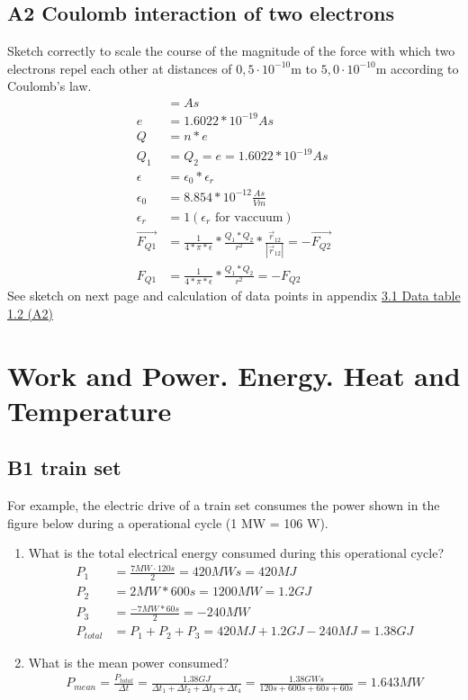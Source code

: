 \documentclass[10pt,ngerman]{scrartcl}
\begin{document}
\subsection{A2 Coulomb interaction of two electrons}
Sketch correctly to scale the course of the magnitude of the force with which two electrons repel each other at distances of $0,5 \cdot 10^{-10}$m to $5,0 \cdot 10^{-10}$m according to Coulomb's law.
\begin{align*}
	[Q] &= As \\
	e &= 1.6022 * 10^{-19} As \\
	Q &= n * e \\
	Q_{1} &= Q_{2} = e = 1.6022 * 10^{-19} As \\
	\epsilon &= \epsilon_{0} * \epsilon_{r} \\
	\epsilon_{0} &= 8.854 * 10^{-12} \frac{As}{Vm} \\
	\epsilon_{r} &= 1 (\epsilon_{r} \text{ for vaccuum})\\
	\vec{F_{Q1}} &= \frac{1}{4 * \pi * \epsilon } * \frac{Q_{1}*Q_{2}}{r^{2}} * \frac{\vec{r}_{12}}{|\vec{r}_{12}|} = -\vec{F_{Q2}} \\
	F_{Q1} &= \frac{1}{4 * \pi * \epsilon } * \frac{Q_{1}*Q_{2}}{r^{2}} = -F_{Q2}
\end{align*}
See sketch on next page and calculation of data points in appendix \hyperref[sec:data-table-a2]{3.1 Data table 1.2 (A2)}

\begin{landscape}
 
\end{landscape}

\newpage
\section{Work and Power. Energy. Heat and Temperature}
\subsection{B1 train set}
For example, the electric drive of a train set consumes the power shown in the figure below during a operational cycle (1 MW = 106 W).

\begin{enumerate}
	\item What is the total electrical energy consumed during this operational cycle?
	\begin{align}
		P_{1} &= \frac{7MW\cdot 120s}{2} = 420MWs = 420MJ\\
		P_{2} &= 2 MW * 600s = 1200 MW = 1.2 GJ\\
		P_{3} &= \frac{-7MW * 60s}{2} = -240 MW\\
		P_{total} &= P_{1} + P_{2} + P_{3} = 420MJ + 1.2 GJ - 240 MJ = 1.38 GJ
	\end{align}
	\item What is the mean power consumed?
	\begin{align}
        P_{mean} = \frac{P_{total}}{\Delta t} = \frac{1.38 GJ}{\Delta t_{1} +\Delta t_{2} +\Delta t_{3} +\Delta t_{4}}
		= \frac{1.38GWs}{120s + 600s + 60s + 60s} = 1.643MW
    \end{align}
\end{enumerate}
\end{document}

